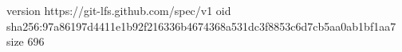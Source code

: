 version https://git-lfs.github.com/spec/v1
oid sha256:97a86197d4411e1b92f216336b4674368a531dc3f8853c6d7cb5aa0ab1bf1aa7
size 696
